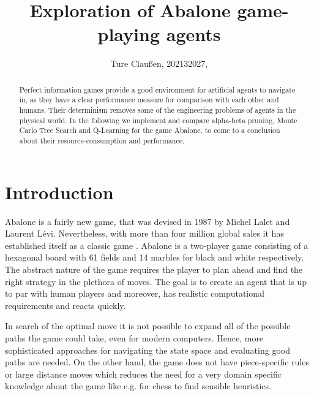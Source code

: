 \documentclass{llncs}
\begin{document}
\title{Exploration of Abalone game-playing agents}
\author{Ture Claußen, 202132027, }

{\def\addcontentsline#1#2#3{}\maketitle} %

\begin{abstract}
  Perfect information games provide a good environment for artificial agents to navigate in, as they have a clear performance measure for comparison with each other and humans. Their determinism removes some of the engineering problems of agents in the physical world. In the following we implement and compare alpha-beta pruning, Monte Carlo Tree Search and Q-Learning for the game Abalone, to come to a conclusion about their resource-consumption and performance.
\end{abstract}

\section{Introduction}

Abalone is a fairly new game, that was devised in 1987 by Michel Lalet and Laurent Lévi. Nevertheless, with more than four million global sales it has established itself as a classic game \cite{noauthor_abalone_2020}. Abalone is a two-player game consisting of a hexagonal board with 61 fields and 14 marbles for black and white respectively. The abstract nature of the game requires the player to plan ahead and find the right strategy in the plethora of moves. The goal is to create an agent that is up to par with human players and moreover, has realistic computational requirements and reacts quickly.

In search of the optimal move it is not possible to expand all of the possible paths the game could take, even for modern computers. Hence, more sophisticated approaches for navigating the state space and evaluating good paths are needed. On the other hand, the game does not have piece-specific rules or large distance moves which reduces the need for a very domain specific knowledge about the game like e.g. for chess to find sensible heuristics.
\end{document}
